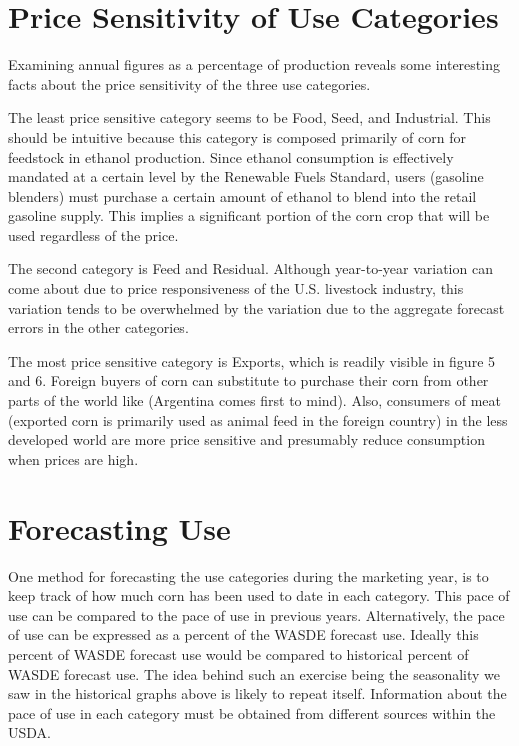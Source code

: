 \documentclass[
]{book}
\begin{document}
\hypertarget{price-sensitivity-of-use-categories}{%
\section{Price Sensitivity of Use Categories}\label{price-sensitivity-of-use-categories}}

Examining annual figures as a percentage of production reveals some
interesting facts about the price sensitivity of the three use
categories.

The least price sensitive category seems to be Food, Seed, and
Industrial. This should be intuitive because this category is composed
primarily of corn for feedstock in ethanol production. Since ethanol
consumption is effectively mandated at a certain level by the Renewable
Fuels Standard, users (gasoline blenders) must purchase a certain amount
of ethanol to blend into the retail gasoline supply. This implies a
significant portion of the corn crop that will be used regardless of the
price.

The second category is Feed and Residual. Although year-to-year
variation can come about due to price responsiveness of the U.S.
livestock industry, this variation tends to be overwhelmed by the
variation due to the aggregate forecast errors in the other categories.

The most price sensitive category is Exports, which is readily visible
in figure 5 and 6. Foreign buyers of corn can substitute to purchase
their corn from other parts of the world like (Argentina comes first to
mind). Also, consumers of meat (exported corn is primarily used as
animal feed in the foreign country) in the less developed world are more
price sensitive and presumably reduce consumption when prices are high.

\hypertarget{forecasting-use}{%
\section{Forecasting Use}\label{forecasting-use}}

One method for forecasting the use categories during the marketing year,
is to keep track of how much corn has been used to date in each
category. This pace of use can be compared to the pace of use in
previous years. Alternatively, the pace of use can be expressed as a
percent of the WASDE forecast use. Ideally this percent of WASDE
forecast use would be compared to historical percent of WASDE forecast
use. The idea behind such an exercise being the seasonality we saw in
the historical graphs above is likely to repeat itself. Information
about the pace of use in each category must be obtained from different
sources within the USDA.
\end{document}
